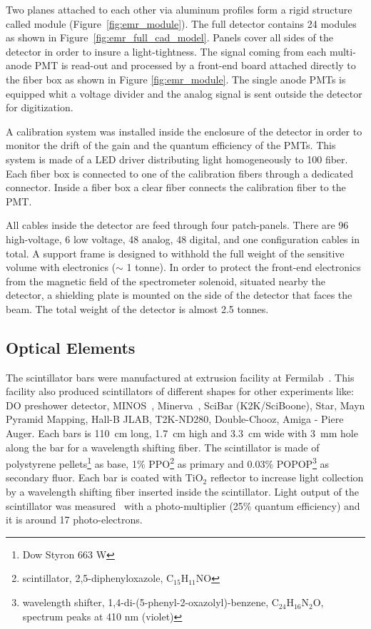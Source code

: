 \documentclass[a4paper,11pt]{article}
\begin{document}
Two planes attached to each other via aluminum profiles form a rigid structure called module (Figure~\ref{fig:emr_module}). 
The full detector contains 24 modules as shown in Figure~\ref{fig:emr_full_cad_model}. Panels cover all sides of the detector
in order to insure a light-tightness. The signal coming from each multi-anode PMT is read-out and processed by a front-end board
attached directly to the fiber box as shown in Figure \ref{fig:emr_module}. The single anode PMTs is equipped whit a
voltage divider and the analog signal is sent outside the detector for digitization.

A calibration system was installed inside the enclosure of the detector in order to monitor the drift of the gain and the quantum
efficiency of the PMTs. This system is made of a LED driver distributing light homogeneously to 100 fiber. Each fiber box is
connected to one of the calibration fibers through a dedicated connector. Inside a fiber box a clear fiber connects the calibration
fiber to the PMT.

All cables inside the detector are feed through four patch-panels. There are 96 high-voltage, 6 low voltage, 48 analog, 48 digital,
and one configuration cables in total. A support frame is designed to withhold the full weight of the sensitive volume with electronics
($\sim$ 1 tonne). In order to protect the front-end electronics from the magnetic field of the spectrometer solenoid, situated nearby
the detector, a shielding plate is mounted on the side of the detector that faces the beam. The total weight of the detector is almost
2.5 tonnes.

\subsection{Optical Elements}
The scintillator bars were manufactured at extrusion facility at Fermilab~\cite{PlaDalmau:2001fr}.
This facility also produced scintillators of different shapes for other experiments like: DO preshower detector, MINOS~\cite{PlaDalmau:2001en},
Minerva~\cite{PlaDalmau:2005df}, SciBar (K2K/SciBoone), Star, Mayn Pyramid Mapping, Hall-B JLAB, T2K-ND280, Double-Chooz, Amiga - Piere Auger.
Each bars is 110~cm long, 1.7~cm high and
3.3~cm wide with 3~mm hole along the bar for a wavelength shifting fiber. The scintillator is made of polystyrene
pellets\footnote{Dow Styron 663 W} as base, 1\% PPO\footnote{scintillator, 2,5-diphenyloxazole, C$_{15}$H$_{11}$NO} as primary and 0.03\% 
POPOP\footnote{wavelength shifter, 1,4-di-(5-phenyl-2-oxazolyl)-benzene, C$_{24}$H$_{16}$N$_{2}$O, spectrum peaks at 410 nm (violet)} 
as secondary fluor. Each bar is coated with TiO$_2$ reflector to increase light collection by a wavelength shifting fiber inserted inside
the scintillator. Light output of the scintillator was measured~\cite{PlaDalmau:2001fr} with a photo-multiplier (25\% quantum efficiency)
and it is around 17 photo-electrons. 
\end{document}
